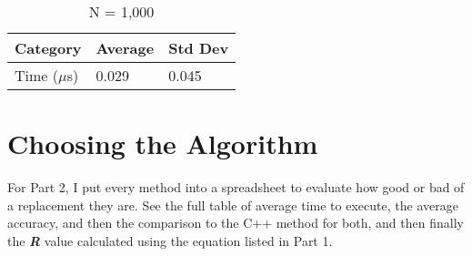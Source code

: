 \documentclass{article}
\begin{document}
\vspace{3mm}

\begin{table}[ht!]
\centering
\begin{tabular}{l|l|l}
Category        &   Average &   Std Dev \\
\hline
Time ($\mu$s)    &   0.029   &   0.045   \\
\end{tabular}
\caption{N = 1,000}
\end{table}


\section{Choosing the Algorithm}

For Part 2, I put every method into a spreadsheet to evaluate how good or bad of a replacement they are. See the full table of average time to execute, the average accuracy, and then the comparison to the C++ method for both, and then finally the \textbf{\textit{R}} value calculated using the equation listed in Part 1.
\end{document}
